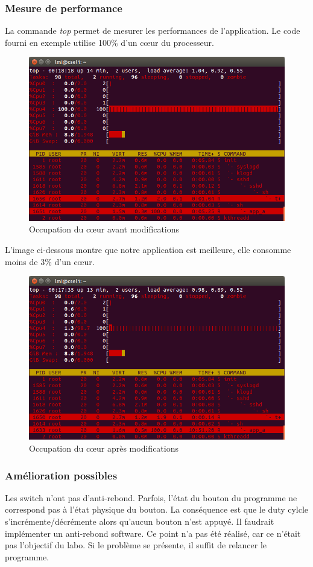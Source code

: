 \subsubsection{Mesure de performance}
La commande \textit{top} permet de mesurer les performances de l'application. Le code fourni en exemple utilise 100\% d'un cœur du processeur.
\begin{figure}[H]
	\begin{center}
		\includegraphics[width=14cm]{img/top2.png}
		\caption{Occupation du cœur avant modifications}
		\label{top2}
	\end{center}
\end{figure}
L'image ci-dessous montre que notre application est meilleure, elle consomme moins de 3\% d'un cœur.
\begin{figure}[H]
	\begin{center}
		\includegraphics[width=14cm]{img/top1.png}
		\caption{Occupation du cœur après modifications}
		\label{top1}
	\end{center}
\end{figure}
\subsubsection{Amélioration possibles}
Les switch n'ont pas d'anti-rebond. Parfois, l'état du bouton du programme ne correspond pas à l'état physique du bouton. La conséquence est que le duty cylcle s'incrémente/décrémente alors qu'aucun bouton n'est appuyé. Il faudrait implémenter un anti-rebond software. Ce point n'a pas été réalisé, car ce n'était pas l'objectif du labo. Si le problème se présente, il suffit de relancer le programme.